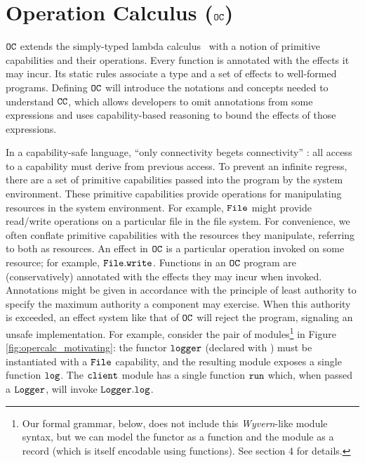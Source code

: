 \section{Operation Calculus ($\mathtt{OC}$)}

$\mathtt{OC}$ extends the simply-typed lambda calculus~\cite{pierce02} with a notion of primitive capabilities and their operations.
Every function is annotated with the effects it may incur.
Its static rules associate a type and a set of effects to well-formed programs.
Defining $\mathtt{OC}$ will introduce the notations and concepts needed to understand $\mathtt{CC}$, which allows developers to omit annotations from some expressions and uses capability-based reasoning to bound the effects of those expressions.

In a capability-safe language, ``only connectivity begets connectivity'' \cite{miller06}: all access to a capability must derive from previous access.
To prevent an infinite regress, there are a set of primitive capabilities passed into the program by the system environment.
These primitive capabilities provide operations for manipulating resources in the system environment.
For example, $\mathtt{File}$ might provide read/write operations on a particular file in the file system.
For convenience, we often conflate primitive capabilities with the resources they manipulate, referring to both as resources.
An effect in $\mathtt{OC}$ is a particular operation invoked on some resource; for example, $\mathtt{File.write}$.
Functions in an $\mathtt{OC}$ program are (conservatively) annotated with the effects they may incur when invoked. Annotations might be given in accordance with the principle of least authority to specify the maximum authority a component may exercise.
When this authority is exceeded, an effect system like that of $\mathtt{OC}$ will reject the program, signaling an unsafe implementation.
For example, consider the pair of modules\footnote{Our formal grammar, below, does not include this \textit{Wyvern}-like module syntax, but we can model the  functor as a function and the  module as a record (which is itself encodable using functions).  See section 4 for details.} in Figure \ref{fig:opercalc_motivating}: the functor $\mathtt{logger}$ (declared with  ) must be instantiated with a $\mathtt{File}$ capability, and the resulting module exposes a single function $\mathtt{log}$.
The $\mathtt{client}$ module has a single function $\mathtt{run}$ which, when passed a $\mathtt{Logger}$, will invoke $\mathtt{Logger.log}$.

